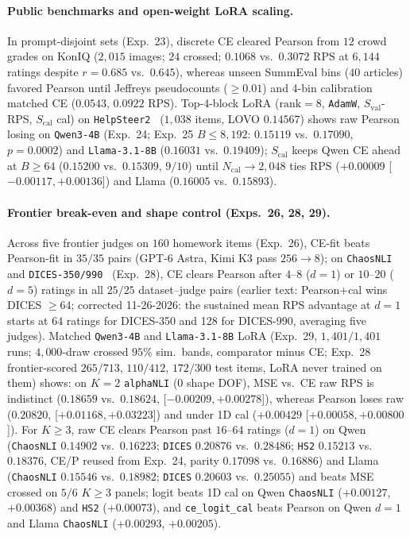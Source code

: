 \paragraph{Public benchmarks and open-weight LoRA scaling.}
In prompt-disjoint sets (Exp.~23), discrete CE cleared Pearson from $12$ crowd grades on KonIQ ($2{,}015$ images; $24$ crossed; $0.1068$ vs.\ $0.3072$ RPS at $6{,}144$ ratings despite $r=0.685$ vs.\ $0.645$), whereas unseen SummEval bins ($40$ articles) favored Pearson until Jeffreys pseudocounts ($\ge 0.01$) and 4-bin calibration matched CE ($0.0543$, $0.0922$ RPS). Top-4-block LoRA ($\text{rank}=8$, \texttt{AdamW}, $S_{\text{val}}$-RPS, $S_{\text{cal}}$ cal) on \texttt{HelpSteer2}~\citep{wang2024helpsteer2} ($1{,}038$ items, LOVO $0.14567$) shows raw Pearson losing on \texttt{Qwen3-4B} (Exp.~24; Exp.~25 $B\le 8{,}192$: $0.15119$ vs.\ $0.17090$, $p=0.0002$) and \texttt{Llama-3.1-8B} ($0.16031$ vs.\ $0.19409$); $S_{\text{cal}}$ keeps Qwen CE ahead at $B\ge 64$ ($0.15200$ vs.\ $0.15309$, $9/10$) until $N_{\text{cal}}\to 2{,}048$ ties RPS ($+0.00009$ [$-0.00117,+0.00136$]) and Llama ($0.16005$ vs.\ $0.15893$).
\paragraph{Frontier break-even and shape control (Exps.~26, 28, 29).}
Across five frontier judges on $160$ homework items (Exp.~26), CE-fit beats Pearson-fit in $35/35$ pairs (GPT-6 Astra, Kimi K3 pass $256\to 8$); on \texttt{ChaosNLI}~\citep{nie2020chaosnli} and \texttt{DICES-350/990}~\citep{aroyo2023dices} (Exp.~28), CE clears Pearson after $4$--$8$ ($d=1$) or $10$--$20$ ($d=5$) ratings in all $25/25$ dataset--judge pairs (earlier text: Pearson+cal wins DICES $\ge 64$; corrected 11-26-2026: the sustained mean RPS advantage at $d=1$ starts at 64 ratings for DICES-350 and 128 for DICES-990, averaging five judges). Matched \texttt{Qwen3-4B} and \texttt{Llama-3.1-8B} LoRA (Exp.~29, $1{,}401/1{,}401$ runs; $4{,}000$-draw crossed $95\%$ sim.\ bands, comparator minus CE; Exp.~28 frontier-scored $265/713$, $110/412$, $172/300$ test items, LoRA never trained on them) shows: on $K=2$ \texttt{alphaNLI} ($0$ shape DOF), MSE vs.\ CE raw RPS is indistinct ($0.18659$ vs.\ $0.18624$, [$-0.00209,+0.00278$]), whereas Pearson loses raw ($0.20820$, [$+0.01168,+0.03223$]) and under 1D cal ($+0.00429$ [$+0.00058,+0.00800$]). For $K\ge 3$, raw CE clears Pearson past $16$--$64$ ratings ($d=1$) on Qwen (\texttt{ChaosNLI} $0.14902$ vs.\ $0.16223$; \texttt{DICES} $0.20876$ vs.\ $0.28486$; \texttt{HS2} $0.15213$ vs.\ $0.18376$, CE/P reused from Exp.~24, parity $0.17098$ vs.\ $0.16886$) and Llama (\texttt{ChaosNLI} $0.15546$ vs.\ $0.18982$; \texttt{DICES} $0.20603$ vs.\ $0.25055$) and beats MSE crossed on $5/6$ $K\ge 3$ panels; logit beats 1D cal on Qwen \texttt{ChaosNLI} ($+0.00127$, $+0.00368$) and \texttt{HS2} ($+0.00073$), and \texttt{ce\_logit\_cal} beats Pearson on Qwen $d=1$ and Llama \texttt{ChaosNLI} ($+0.00293$, $+0.00205$).
